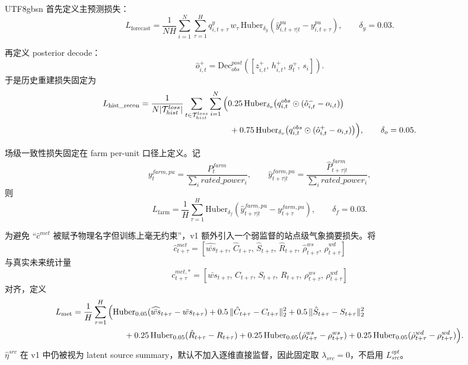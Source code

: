 \documentclass[11pt]{article}
\begin{document}
\begin{CJK}{UTF8}{gbsn}
首先定义主预测损失：
\[
L_{\mathrm{forecast}}
=
\frac{1}{NH}\sum_{i=1}^{N}\sum_{\tau=1}^{H} q^{y}_{i,t+\tau}\,w_\tau\,\mathrm{Huber}_{\delta_y}\!\left(\hat y^{pu}_{i,t+\tau|t}-y^{pu}_{i,t+\tau}\right),
\qquad \delta_y=0.03.
\]

再定义 posterior decode：
\[
\hat o^+_{i,t}=\mathrm{Dec}^{post}_{obs}\left([z^+_{i,t},\, h^+_{i,t},\, g_t^+,\, s_i]\right).
\]
于是历史重建损失固定为
\[
\begin{aligned}
L_{\mathrm{hist\_recon}}
&=
\frac{1}{N|\mathcal T_{hist}^{loss}|}
\sum_{t\in \mathcal T_{hist}^{loss}}\sum_{i=1}^{N}
\Big(
0.25\,\mathrm{Huber}_{\delta_o}\big(q^{obs}_{i,t}\odot(\hat o^-_{i,t}-o_{i,t})\big)\\
&\hspace{3.8cm}+
0.75\,\mathrm{Huber}_{\delta_o}\big(q^{obs}_{i,t}\odot(\hat o^+_{i,t}-o_{i,t})\big)
\Big),
\qquad \delta_o=0.05.
\end{aligned}
\]

场级一致性损失固定在 farm per-unit 口径上定义。记
\[
y^{farm,pu}_{t}=\frac{P^{farm}_{t}}{\sum_i rated\_power_i},
\qquad
\hat y^{farm,pu}_{t+\tau|t}=\frac{\hat P^{farm}_{t+\tau|t}}{\sum_i rated\_power_i},
\]
则
\[
L_{\mathrm{farm}}
=
\frac{1}{H}\sum_{\tau=1}^{H}
\mathrm{Huber}_{\delta_f}\left(\hat y^{farm,pu}_{t+\tau|t}-y^{farm,pu}_{t+\tau}\right),
\qquad \delta_f=0.03.
\]

为避免 ``$\hat c^{met}$ 被赋予物理名字但训练上毫无约束''，v1 额外引入一个弱监督的站点级气象摘要损失。将
\[
\hat c^{met}_{t+\tau}=
\left[\widehat{\bar{ws}}_{t+\tau},\, \hat C_{t+\tau},\, \hat S_{t+\tau},\, \hat R_{t+\tau},\, \hat\rho^{ws}_{t+\tau},\, \hat\rho^{wd}_{t+\tau}\right]
\]
与真实未来统计量
\[
c^{met,*}_{t+\tau}=
\left[\bar{ws}_{t+\tau},\, C_{t+\tau},\, S_{t+\tau},\, R_{t+\tau},\, \rho^{ws}_{t+\tau},\, \rho^{wd}_{t+\tau}\right]
\]
对齐，定义
\[
\begin{aligned}
L_{\mathrm{met}}
&=
\frac{1}{H}\sum_{\tau=1}^{H}
\Big(
\mathrm{Huber}_{0.05}(\widehat{\bar{ws}}_{t+\tau}-\bar{ws}_{t+\tau})
+0.5\,\|\hat C_{t+\tau}-C_{t+\tau}\|_2^2
+0.5\,\|\hat S_{t+\tau}-S_{t+\tau}\|_2^2 \\
&\hspace{2.2cm}+
0.25\,\mathrm{Huber}_{0.05}(\hat R_{t+\tau}-R_{t+\tau})
+0.25\,\mathrm{Huber}_{0.05}(\hat\rho^{ws}_{t+\tau}-\rho^{ws}_{t+\tau})
+0.25\,\mathrm{Huber}_{0.05}(\hat\rho^{wd}_{t+\tau}-\rho^{wd}_{t+\tau})
\Big).
\end{aligned}
\]
$\hat\eta^{src}$ 在 v1 中仍被视为 latent source summary，默认不加入逐维直接监督，因此固定取 $\lambda_{src}=0$，不启用 $L_{src}^{opt}$。


\end{CJK}
\end{document}
